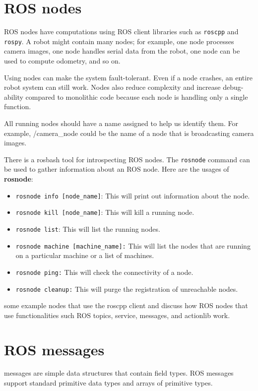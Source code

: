 \documentclass[../../main]{subfiles}
\begin{document}
\section{ROS nodes}
ROS nodes have computations using ROS client libraries such as \texttt{roscpp} and \texttt{rospy}. A robot might contain many nodes; for example, one node processes camera images, one node handles serial data from the robot, one node can be used to compute odometry, and so on.

Using nodes can make the system fault-tolerant. Even if a node crashes, an entire robot system can still work. Nodes also reduce complexity and increase debug-ability compared to monolithic code because each node is handling only a single function.

All running nodes should have a name assigned to help us identify them. For example, /camera\_node could be the name of a node that is broadcasting camera images.

There is a rosbash tool for introspecting ROS nodes. The \texttt{rosnode} command can be used to gather information about an ROS node. Here are the usages of \textbf{rosnode}:

\begin{itemize}
    \item \texttt{rosnode info [node\_name]}: This will print out information about the node.
    \item \texttt{rosnode kill [node\_name]}: This will kill a running node.
    \item \texttt{rosnode list}: This will list the running nodes.
    \item  \texttt{rosnode machine [machine\_name]:} This will list the nodes that are running
    on a particular machine or a list of machines.
    \item  \texttt{rosnode ping:} This will check the connectivity of a node.
    \item  \texttt{rosnode cleanup:} This will purge the registration of unreachable nodes.
\end{itemize}
some example nodes that use the roscpp client and discuss how
ROS nodes that use functionalities such ROS topics, service, messages, and actionlib
work.
\section{ROS messages}\label{message}
messages are simple data structures that contain field types. ROS messages support standard primitive data types and arrays of primitive types.
\end{document}
